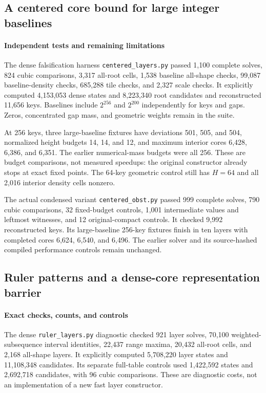 \documentclass[11pt]{article}
\begin{document}
\subsection{A centered core bound for large integer baselines}
\paragraph{Independent tests and remaining limitations}\label{sec:legacy-20-3}
The dense falsification harness \texttt{centered\_}\allowbreak\texttt{layers.py} passed 1,100
complete solves, 824 cubic comparisons, 3,317 all-root cells, 1,538 baseline
all-shape checks, 99,087 baseline-density checks, 685,288 tile checks, and
2,327 scale checks. It explicitly computed 4,153,053 dense states and
8,223,340 root candidates and reconstructed 11,656 keys. Baselines include
$2^{256}$ and $2^{200}$ independently for keys and gaps. Zeros, concentrated
gap mass, and geometric weights remain in the suite.

At 256 keys, three large-baseline fixtures have deviations 501, 505, and 504,
normalized height budgets 14, 14, and 12, and maximum interior cores 6,428,
6,386, and 6,351. The earlier numerical-mass budgets were all 256. These
are budget comparisons, not measured speedups: the original constructor
already stops at exact fixed points. The 64-key geometric control still has
$H=64$ and all 2,016 interior density cells nonzero.

The actual condensed variant \texttt{centered\_obst.py} passed 999 complete
solves, 790 cubic comparisons, 32 fixed-budget controls, 1,001 intermediate
values and leftmost witnesses, and 12 original-compact controls. It checked
9,992 reconstructed keys. Its large-baseline 256-key fixtures finish in ten
layers with completed cores 6,624, 6,540, and 6,496. The earlier solver and
its source-hashed compiled performance controls remain unchanged.




\subsection{Ruler patterns and a dense-core representation barrier}
\paragraph{Exact checks, counts, and controls}\label{sec:legacy-21-4}
The dense \texttt{ruler\_layers.py} diagnostic checked 921 layer solves,
70,100 weighted-subsequence interval identities, 22,437 range maxima,
20,432 all-root cells, and 2,168 all-shape layers. It explicitly computed
5,708,220 layer states and 11,108,348 candidates. Its separate full-table
controls used 1,422,592 states and 2,692,718 candidates, with 96 cubic
comparisons. These are diagnostic costs, not an implementation of a new
fast layer constructor.
\end{document}
